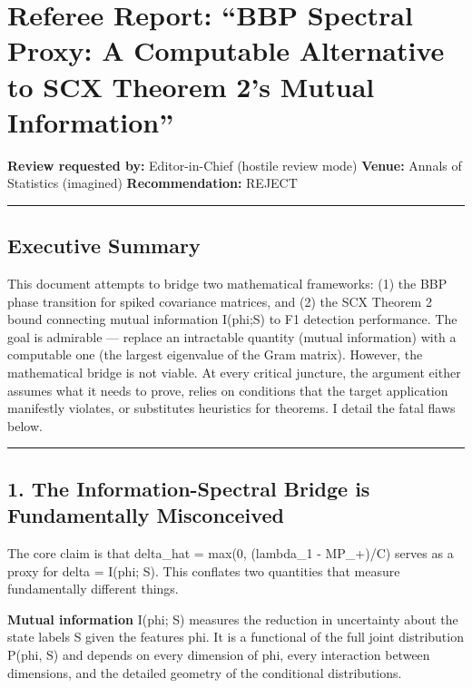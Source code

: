 \documentclass[
  12pt,
]{article}
\author{SCX}
\date{2026}
\begin{document}
\section{Referee Report: ``BBP Spectral Proxy: A Computable Alternative
to SCX Theorem 2's Mutual
Information''}\label{referee-report-bbp-spectral-proxy-a-computable-alternative-to-scx-theorem-2s-mutual-information}

\textbf{Review requested by:} Editor-in-Chief (hostile review mode)
\textbf{Venue:} Annals of Statistics (imagined) \textbf{Recommendation:}
REJECT

\begin{center}\rule{0.5\linewidth}{0.5pt}\end{center}

\subsection{Executive Summary}\label{executive-summary}

This document attempts to bridge two mathematical frameworks: (1) the
BBP phase transition for spiked covariance matrices, and (2) the SCX
Theorem 2 bound connecting mutual information I(phi;S) to F1 detection
performance. The goal is admirable --- replace an intractable quantity
(mutual information) with a computable one (the largest eigenvalue of
the Gram matrix). However, the mathematical bridge is not viable. At
every critical juncture, the argument either assumes what it needs to
prove, relies on conditions that the target application manifestly
violates, or substitutes heuristics for theorems. I detail the fatal
flaws below.

\begin{center}\rule{0.5\linewidth}{0.5pt}\end{center}

\subsection{1. The Information-Spectral Bridge is Fundamentally
Misconceived}\label{the-information-spectral-bridge-is-fundamentally-misconceived}

The core claim is that delta\_hat = max(0, (lambda\_1 - MP\_+)/C) serves
as a proxy for delta = I(phi; S). This conflates two quantities that
measure fundamentally different things.

\textbf{Mutual information} I(phi; S) measures the reduction in
uncertainty about the state labels S given the features phi. It is a
functional of the full joint distribution P(phi, S) and depends on every
dimension of phi, every interaction between dimensions, and the detailed
geometry of the conditional distributions.
\end{document}
